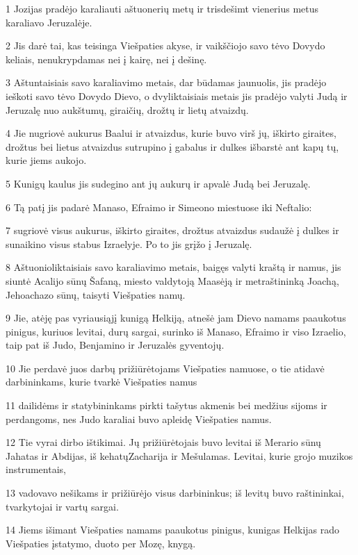 \par 1 Jozijas pradėjo karaliauti aštuonerių metų ir trisdešimt vienerius metus karaliavo Jeruzalėje. 
\par 2 Jis darė tai, kas teisinga Viešpaties akyse, ir vaikščiojo savo tėvo Dovydo keliais, nenukrypdamas nei į kairę, nei į dešinę. 
\par 3 Aštuntaisiais savo karaliavimo metais, dar būdamas jaunuolis, jis pradėjo ieškoti savo tėvo Dovydo Dievo, o dvyliktaisiais metais jis pradėjo valyti Judą ir Jeruzalę nuo aukštumų, giraičių, drožtų ir lietų atvaizdų. 
\par 4 Jie nugriovė aukurus Baalui ir atvaizdus, kurie buvo virš jų, iškirto giraites, drožtus bei lietus atvaizdus sutrupino į gabalus ir dulkes išbarstė ant kapų tų, kurie jiems aukojo. 
\par 5 Kunigų kaulus jis sudegino ant jų aukurų ir apvalė Judą bei Jeruzalę. 
\par 6 Tą patį jis padarė Manaso, Efraimo ir Simeono miestuose iki Neftalio: 
\par 7 sugriovė visus aukurus, iškirto giraites, drožtus atvaizdus sudaužė į dulkes ir sunaikino visus stabus Izraelyje. Po to jis grįžo į Jeruzalę. 
\par 8 Aštuonioliktaisiais savo karaliavimo metais, baigęs valyti kraštą ir namus, jis siuntė Acalijo sūnų Šafaną, miesto valdytoją Maasėją ir metraštininką Joachą, Jehoachazo sūnų, taisyti Viešpaties namų. 
\par 9 Jie, atėję pas vyriausiąjį kunigą Helkiją, atnešė jam Dievo namams paaukotus pinigus, kuriuos levitai, durų sargai, surinko iš Manaso, Efraimo ir viso Izraelio, taip pat iš Judo, Benjamino ir Jeruzalės gyventojų. 
\par 10 Jie perdavė juos darbų prižiūrėtojams Viešpaties namuose, o tie atidavė darbininkams, kurie tvarkė Viešpaties namus­ 
\par 11 dailidėms ir statybininkams pirkti tašytus akmenis bei medžius sijoms ir perdangoms, nes Judo karaliai buvo apleidę Viešpaties namus. 
\par 12 Tie vyrai dirbo ištikimai. Jų prižiūrėtojais buvo levitai iš Merario sūnų Jahatas ir Abdijas, iš kehatų­Zacharija ir Mešulamas. Levitai, kurie grojo muzikos instrumentais, 
\par 13 vadovavo nešikams ir prižiūrėjo visus darbininkus; iš levitų buvo raštininkai, tvarkytojai ir vartų sargai. 
\par 14 Jiems išimant Viešpaties namams paaukotus pinigus, kunigas Helkijas rado Viešpaties įstatymo, duoto per Mozę, knygą. 
